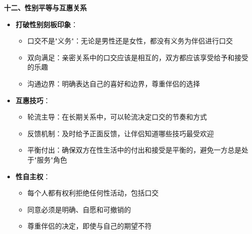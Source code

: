 \documentclass[12pt,UTF8]{ctexbook}
\begin{document}
  \textbf{十二、性别平等与互惠关系}
  \begin{itemize}
  \item \textbf{打破性别刻板印象}：
    \begin{itemize}
    \item 口交不是"义务"：无论是男性还是女性，都没有义务为伴侣进行口交
    \item 双向满足：亲密关系中的口交应该是相互的，双方都应该享受给予和接受的乐趣
    \item 沟通边界：明确表达自己的喜好和边界，尊重伴侣的选择
    \end{itemize}
  \item \textbf{互惠技巧}：
    \begin{itemize}
    \item 轮流主导：在长期关系中，可以轮流决定口交的节奏和方式
    \item 反馈机制：及时给予正面反馈，让伴侣知道哪些技巧最受欢迎
    \item 平衡付出：确保双方在性生活中的付出和接受是平衡的，避免一方总是处于"服务"角色
    \end{itemize}
  \item \textbf{性自主权}：
    \begin{itemize}
    \item 每个人都有权利拒绝任何性活动，包括口交
    \item 同意必须是明确、自愿和可撤销的
    \item 尊重伴侣的决定，即使与自己的期望不符
    \end{itemize}
  \end{itemize}
\end{document}

